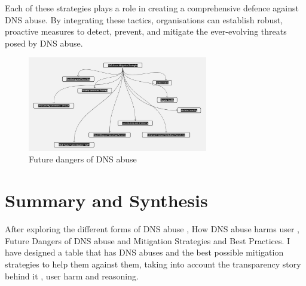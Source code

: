 Each of these strategies plays a role in creating a comprehensive defence against DNS abuse. By integrating these tactics, organisations can establish robust, proactive measures to detect, prevent, and mitigate the ever-evolving threats posed by DNS abuse.

\captionsetup{font= footnotesize}
\begin{figure}[H]
\centering
\includegraphics[width=0.7\textwidth]{background/DNSabuseMiti.jpg}
\caption{Future dangers of DNS abuse}
\label{fig:figureSix}
\end{figure}




\section{Summary and Synthesis}

After exploring the different forms of DNS abuse , How DNS abuse harms user , Future Dangers of DNS abuse and Mitigation Strategies and Best Practices. I have designed a table that has DNS abuses and the best possible mitigation strategies to help them against them, taking into account the transparency story behind it , user harm and reasoning. 

